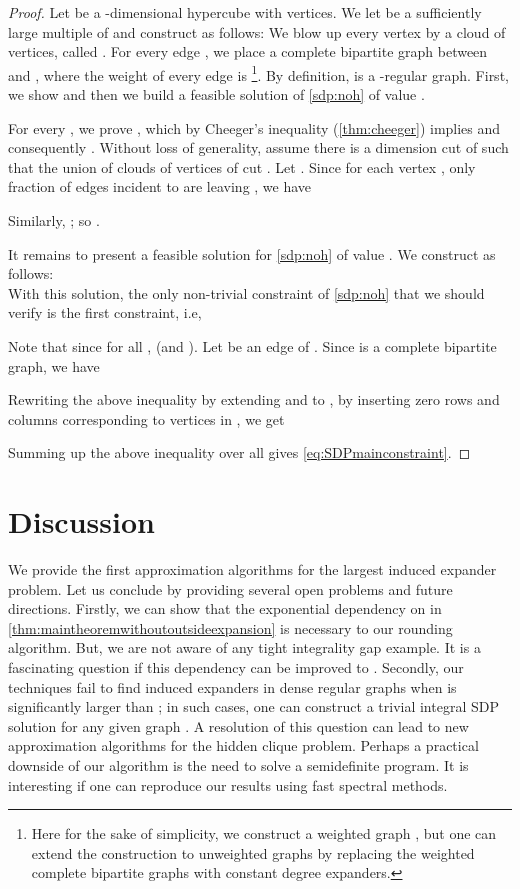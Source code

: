 \documentclass[11pt]{article}
\begin{document}
\begin{proof}
Let  be a -dimensional hypercube with  vertices. We let  be a  sufficiently large multiple of  and construct  as follows:   
We blow up every vertex  by a cloud of   vertices, called . For every edge , 
we place a complete  bipartite graph between  and , where 
the weight of every edge is \footnote{Here for the sake of 
simplicity, we construct a weighted graph , but one can extend the construction to unweighted graphs by replacing the weighted complete bipartite graphs with constant degree expanders.}.
By definition,  is a -regular graph. First, we show  and then we 
build a feasible solution of \ref{sdp:noh} of value .

For every , we prove , which 
by Cheeger's inequality (\autoref{thm:cheeger}) implies  and 
consequently .
 Without loss of generality, 
assume there is a  dimension cut  of  such that the union of clouds of vertices of  cut . Let . Since for each vertex , only  fraction of edges incident to  are leaving , we have 

Similarly, ; so . 

It remains to  present a feasible 
solution for \ref{sdp:noh}  of value . We  
construct  as follows: \\ 

With this solution, the only non-trivial constraint of  \ref{sdp:noh} that we should verify is the first constraint, i.e,

Note that since  for all ,  (and ).
Let  be an edge of . Since  is a complete bipartite graph, we have 



Rewriting the above inequality by extending  and  to , by inserting zero rows and columns corresponding to vertices in , we get
 
Summing up the above inequality  over all  gives 
\eqref{eq:SDPmainconstraint}.
\end{proof}



\section{Discussion}
We provide the first approximation algorithms for the largest induced expander problem. Let us conclude by providing several open problems and future directions. Firstly, we can show that the  exponential dependency on  in \autoref{thm:maintheoremwithoutoutsideexpansion} is necessary to our rounding algorithm. But, we are not aware of any tight integrality gap example. It is a fascinating question if this dependency can be improved to . Secondly, our techniques fail to find induced expanders in dense regular graphs when  is significantly larger than ; in such cases, one can construct a trivial integral SDP solution for any given graph . A resolution of this question can lead to new approximation algorithms for the hidden clique problem. Perhaps a practical downside of our algorithm is the need to solve a semidefinite program. It is interesting if one can reproduce our results using fast spectral methods. 








\end{document}

